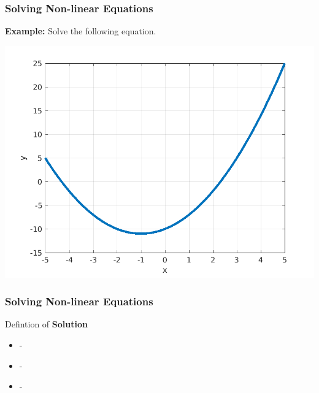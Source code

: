 \documentclass[fleqn]{beamer} %
\newcommand{\sectionIsubsectionIItitle}{Solving Non-linear Equations}
\begin{document}
			\begin{frame}
				\frametitle{\sectionIsubsectionIItitle}
				\bigskip

					\textbf{ Example:} Solve the following equation. \vspace{2mm} \\

					\hspace{2mm}	 \vspace{2mm}

					\hspace*{-1cm}\includegraphics[scale=.45]{images/lecture1_fig1.png}  

				\btVFill
			\end{frame}

			\begin{frame}
				\frametitle{\sectionIsubsectionIItitle}
				\bigskip

				Defintion of \textbf{Solution} 
				\begin{itemize}
					\item - \vspccc
					\item - \vspccc
					\item - \vspccc
				\end{itemize}

				\btVFill
			\end{frame}

\end{document}
